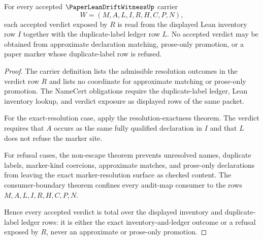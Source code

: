 \begin{theorem}
\label{thm:paper-lean-drift-witness-inventory-verdict-totality}
For every accepted $\PaperLeanDriftWitnessUp$ carrier
$$
W=(M,A,L,I,R,H,C,P,N),
$$
each accepted verdict exposed by $R$ is read from the displayed Lean inventory row $I$ together with the duplicate-label ledger row $L$. No accepted verdict may be obtained from approximate declaration matching, prose-only promotion, or a paper marker whose duplicate-label row is refused.
\end{theorem}
\begin{proof}
The carrier definition lists the admissible resolution outcomes in the verdict row $R$ and lists no coordinate for approximate matching or prose-only promotion. The NameCert obligations require the duplicate-label ledger, Lean inventory lookup, and verdict exposure as displayed rows of the same packet.

For the exact-resolution case, apply the resolution-exactness theorem. The verdict requires that $A$ occurs as the same fully qualified declaration in $I$ and that $L$ does not refuse the marker site.

For refusal cases, the non-escape theorem prevents unresolved names, duplicate labels, marker-kind coercions, approximate matches, and prose-only declarations from leaving the exact marker-resolution surface as checked content. The consumer-boundary theorem confines every audit-map consumer to the rows $M,A,L,I,R,H,C,P,N$.

Hence every accepted verdict is total over the displayed inventory and duplicate-label ledger rows: it is either the exact inventory-and-ledger outcome or a refusal exposed by $R$, never an approximate or prose-only promotion.
\end{proof}

